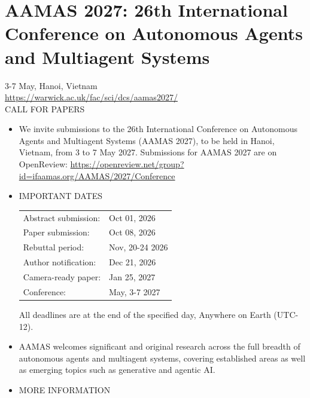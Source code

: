 \documentclass[prodmode,acmtecs]{acmsmall} %
\begin{document}
\section{AAMAS 2027: 26th International Conference on Autonomous Agents and Multiagent Systems}\label{AAMAS2027}  3-7 May, Hanoi, Vietnam\\ 
  \href{https://warwick.ac.uk/fac/sci/dcs/aamas2027/}{https://warwick.ac.uk/fac/sci/dcs/aamas2027/}\\ 
CALL FOR PAPERS 

\begin{itemize}\item  We invite submissions to the 26th International Conference on Autonomous Agents and Multiagent Systems (AAMAS 2027), to be held in Hanoi, Vietnam, from 3 to 7 May 2027. Submissions for AAMAS 2027 are on OpenReview: \href{https://openreview.net/group?id=ifaamas.org/AAMAS/2027/Conference}{https://openreview.net/group?id=ifaamas.org/AAMAS/2027/Conference} 
 
\item  IMPORTANT DATES  
 
\begin{tabulary}{\linewidth}{LL}Abstract submission:  & Oct 01, 2026 \\
Paper submission:  & Oct 08, 2026 \\
Rebuttal period:  & Nov, 20-24 2026 \\
Author notification:  & Dec 21, 2026 \\
Camera-ready paper:  & Jan 25, 2027 \\
Conference:  & May, 3-7 2027 \\
\end{tabulary}
 
  All deadlines are at the end of the specified day, Anywhere on Earth (UTC-12).  
 
\item  AAMAS welcomes significant and original research across the full breadth of autonomous agents and multiagent systems, covering established areas as well as emerging topics such as generative and agentic AI. 
 
\item  MORE INFORMATION 
 

\end{itemize}
\end{document}

